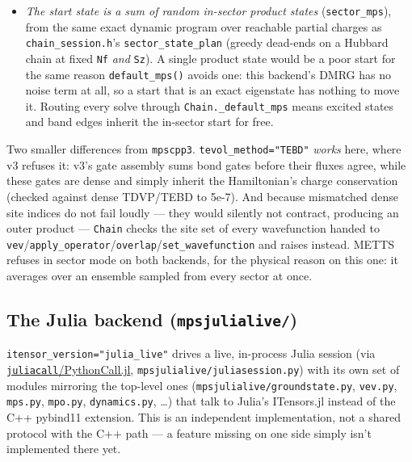 \documentclass[11pt]{article}
\begin{document}
\begin{itemize}
    and with it enabled reproduces sector-restricted ED ---
    \texttt{tests/test\_sector\_conservation\_python.py} locks that down.
    Every solve also checks its converged state's $\langle(\hat
    Q-q)^2\rangle$ and raises rather than reporting the wrong sector's
    energy.
  \item \emph{The start state is a sum of random in-sector product
    states} (\texttt{sector\_mps}), from the same exact dynamic program
    over reachable partial charges as \texttt{chain\_session.h}'s
    \texttt{sector\_state\_plan} (greedy dead-ends on a Hubbard chain at
    fixed \texttt{Nf} \emph{and} \texttt{Sz}). A single product state
    would be a poor start for the same reason \texttt{default\_mps()}
    avoids one: this backend's DMRG has no noise term at all, so a start
    that is an exact eigenstate has nothing to move it. Routing every
    solve through \texttt{Chain.\_default\_mps} means excited states and
    band edges inherit the in-sector start for free.
\end{itemize}

Two smaller differences from \texttt{mpscpp3}.
\texttt{tevol\_method="TEBD"} \emph{works} here, where v3 refuses it:
v3's gate assembly sums bond gates before their fluxes agree, while these
gates are dense and simply inherit the Hamiltonian's charge conservation
(checked against dense TDVP/TEBD to 5e-7). And because mismatched dense
site indices do not fail loudly --- they would silently not contract,
producing an outer product --- \texttt{Chain} checks the site set of
every wavefunction handed to
\texttt{vev}/\texttt{apply\_operator}/\texttt{overlap}/\texttt{set\_wavefunction}
and raises instead. METTS refuses in sector mode on both backends, for
the physical reason on this one: it averages over an ensemble sampled
from every sector at once.

\subsection{The Julia backend (\texttt{mpsjulialive/})}

\texttt{itensor\_version="julia\_live"} drives a live, in-process Julia
session (via
\href{https://github.com/JuliaPy/PythonCall.jl}{\texttt{juliacall}/PythonCall.jl},
\texttt{mpsjulialive/juliasession.py}) with its own set of modules
mirroring the top-level ones (\texttt{mpsjulialive/groundstate.py},
\texttt{vev.py}, \texttt{mps.py}, \texttt{mpo.py}, \texttt{dynamics.py},
\ldots) that talk to Julia's ITensors.jl instead of the C++ pybind11
extension. This is an independent implementation, not a shared protocol
with the C++ path --- a feature missing on one side simply isn't
implemented there yet.
\end{document}
